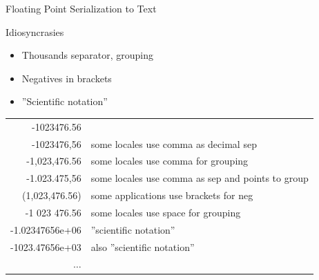 \documentclass[ignorenonframetext,xcolor=x11names]{beamer}
\begin{document}
\begin{frame}[label=full]{Floating Point Serialization to Text}
\begin{block}{Idiosyncrasies}
\begin{itemize}
	\item Thousands separator, grouping
	\item Negatives in brackets
	\item ''Scientific notation''
\end{itemize}
\end{block}

\footnotesize
\centering
\vspace{5mm}
\renewcommand{\arraystretch}{1.25}

\begin{tabular}{r|l} \hline
-1023476.56 & \\
-1023476,56 & some locales use comma as decimal sep \\
-1,023,476.56 & some locales use comma for grouping \\
-1.023.475,56 & some locales use comma as sep and points to group \\
(1,023,476.56) & some applications use brackets for neg \\
-1 023 476.56 & some locales use space for grouping \\
-1.02347656e+06 & ''scientific notation'' \\
-1023.47656e+03 & also ''scientific notation'' \\
$\ldots$ & \\ \hline
\end{tabular}
\end{frame}
\end{document}
